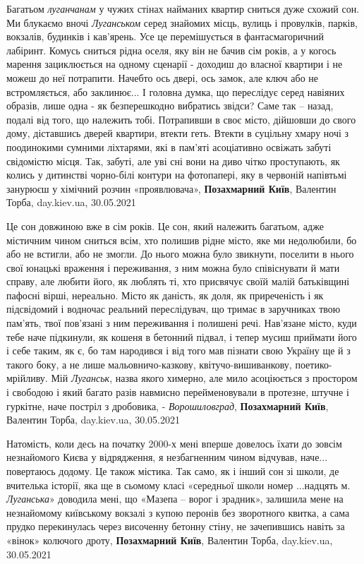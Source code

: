 Багатьом \emph{луганчанам} у чужих стінах найманих квартир сниться дуже схожий сон. Ми
блукаємо вночі \emph{Луганськом} серед знайомих місць, вулиць і провулків, парків,
вокзалів, будинків і кав’ярень. Усе це перемішується в фантасмагоричний
лабіринт. Комусь сниться рідна оселя, яку він не бачив сім років, а у когось
марення зациклюється на одному сценарії - доходиш до власної квартири і не
можеш до неї потрапити. Начебто ось двері, ось замок, але ключ або не
встромляється, або заклинює... І головна думка, що переслідує серед навіяних
образів, лише одна - як безперешкодно вибратись звідси? Саме так – назад,
подалі від того, що належить тобі. Потрапивши в своє місто, дійшовши до свого
дому, діставшись дверей квартири, втекти геть. Втекти в суцільну хмару ночі з
поодинокими сумними ліхтарями, які в пам'яті асоціативно освіжать забуті
свідомістю місця. Так, забуті, але уві сні вони на диво чітко проступають, як
колись у дитинстві чорно-білі контури на фотопапері, яку в червоній напівтьмі
занурюєш у хімічний розчин «проявлювача»,
\textbf{Позахмарний Київ}, Валентин Торба, day.kiev.ua, 30.05.2021

Це сон довжиною вже в сім років. Це сон, який належить багатьом, адже містичним
чином сниться всім, хто полишив рідне місто, яке ми недолюбили, бо або не
встигли, або не змогли. До нього можна було звикнути, поселити в нього свої
юнацькі враження і переживання, з ним можна було співіснувати й мати справу,
але любити його, як люблять ті, хто присвячує своїй малій батьківщині пафосні
вірші, нереально. Місто як даність, як доля, як приреченість і як підсвідомий і
водночас реальний переслідувач, що тримає в заручниках твою пам'ять, твої
пов’язані з ним переживання і полишені речі. Нав’язане місто, куди тебе наче
підкинули, як кошеня в бетонний підвал, і тепер мусиш приймати його і себе
таким, як є, бо там народився і від того мав пізнати свою Україну ще й з такого
боку, а не лише мальовничо-казкову, квітучо-вишиванкову, поетико-мрійливу. Мій
\emph{Луганськ}, назва якого химерно, але мило асоціюється з простором і свободою і
який багато разів навмисно перейменовували в протезне, штучне і гуркітне, наче
постріл з дробовика, - \emph{Ворошиловград},
\textbf{Позахмарний Київ}, Валентин Торба, day.kiev.ua, 30.05.2021

Натомість, коли десь на початку 2000-х мені вперше довелось їхати до зовсім
незнайомого Києва у відрядження, я незбагненним чином відчував, наче...
повертаюсь додому. Це також містика. Так само, як і інший сон зі школи, де
вчителька історії, яка ще в сьомому класі «середньої школи номер ...надцять м.
\emph{Луганська}» доводила мені, що «Мазепа – ворог і зрадник», залишила мене на
незнайомому київському вокзалі з купою перонів без зворотного квитка, а сама
прудко перекинулась через височенну бетонну стіну, не зачепившись навіть за
«вінок» колючого дроту,
\textbf{Позахмарний Київ}, Валентин Торба, day.kiev.ua, 30.05.2021

